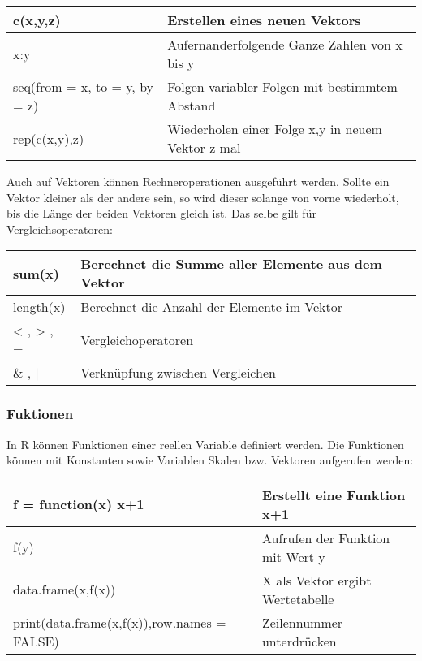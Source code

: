 \documentclass[a4paper,10pt]{scrartcl}
\begin{document}
\begin{table}[H]
    \centering
    \begin{tabular}{|l|l|}
    \hline
c(x,y,z) & Erstellen eines neuen Vektors\\\hline
x:y & Aufernanderfolgende Ganze Zahlen von x bis y\\\hline
seq(from = x, to = y, by = z) & Folgen variabler Folgen mit bestimmtem Abstand\\\hline
rep(c(x,y),z) & Wiederholen einer Folge x,y in neuem Vektor z mal\\\hline
    \end{tabular}
    \label{tab:my_label}
\end{table}

Auch auf Vektoren können Rechneroperationen ausgeführt werden. Sollte ein Vektor kleiner als der andere sein, so wird dieser solange von vorne wiederholt, bis die Länge der beiden Vektoren gleich ist. Das selbe gilt für Vergleichsoperatoren:
\begin{table}[h]
    \centering
    \begin{tabular}{|l|l|}\hline
sum(x) & Berechnet die Summe aller Elemente aus dem Vektor\\\hline
length(x) & Berechnet die Anzahl der Elemente im Vektor\\\hline
 < , > , = & Vergleichoperatoren\\\hline
 \& , | & Verknüpfung zwischen Vergleichen\\\hline 
    \end{tabular}
    \label{tab:my_label}
\end{table}

\subsubsection{Fuktionen}
In R können Funktionen einer reellen Variable definiert werden. Die Funktionen können mit Konstanten sowie Variablen Skalen bzw. Vektoren aufgerufen werden:
\begin{table}[h]
    \centering
    \begin{tabular}{|l|l|}\hline
f = function(x) {x+1} &  Erstellt eine Funktion x+1 \\\hline
f(y) & Aufrufen der Funktion mit Wert y\\\hline
data.frame(x,f(x)) & X als Vektor ergibt Wertetabelle\\\hline
print(data.frame(x,f(x)),row.names = FALSE) & Zeilennummer unterdrücken\\\hline
    \end{tabular}
    \label{tab:my_label}
\end{table}
\end{document}
